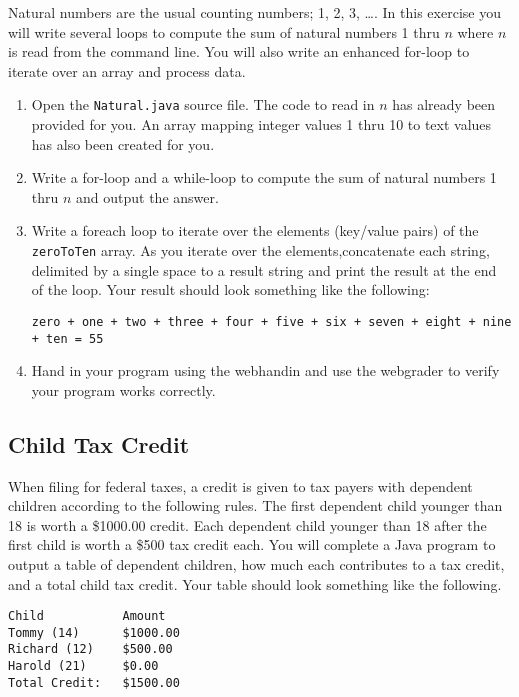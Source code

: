 \documentclass[12pt]{scrartcl}
\begin{document}
Natural numbers are the usual counting numbers; 1, 2, 3, \ldots.  In 
this exercise you will write several loops to compute the sum of 
natural numbers 1 thru $n$ where $n$ is read from the command line.  
You will also write an enhanced for-loop to iterate over an array and 
process data.

\begin{enumerate}
  \item Open the \texttt{Natural.java} source file.  The code 
	to read in $n$ has already been provided for you.  An array mapping 
	integer values 1 thru 10 to text values has also been created for you.
  \item Write a for-loop and a while-loop to compute the sum of natural 
  	numbers 1 thru $n$ and output the answer.
  \item Write a foreach loop to iterate over the elements (key/value pairs) 
	of the \texttt{zeroToTen} array.  As you iterate over the 
	elements,concatenate each string, delimited by a single space to a 
	result string and print the result at the end of the loop.  Your 
	result should look something like the following:
	
	\texttt{zero + one + two + three + four + five + six + seven + eight + nine + ten = 55}
  \item Hand in your program using the webhandin and use the webgrader
    to verify your program works correctly.
\end{enumerate}

\subsection*{Child Tax Credit}

When filing for federal taxes, a credit is given to tax payers 
with dependent children according to the following rules.  The 
first dependent child younger than 18 is worth a \$1000.00 credit.  
Each dependent child younger than 18 after the first child is 
worth a \$500 tax credit each.  You will complete a Java program
to output a table of dependent children, how much each contributes 
to a tax credit, and a total child tax credit.  Your table should 
look something like the following.

\begin{verbatim}
Child           Amount
Tommy (14)      $1000.00
Richard (12)    $500.00
Harold (21)     $0.00
Total Credit:   $1500.00
\end{verbatim}
\end{document}

